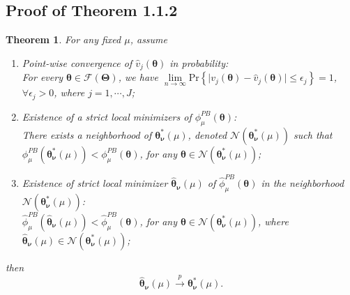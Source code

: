 \documentclass{article}
\newcommand{\wh}{\widehat}
\newcommand{\bs}{ \boldsymbol}
\newcommand{\ml}{\mathcal}
\newcommand{\lt}{\left}
\newcommand{\rt}{\right}
\newtheorem{theorem}{Theorem}[section]
\begin{document}
\begin{appendices}
\section{Proof of Theorem 1.1.2}
\begin{theorem}
	For any fixed $\mu$, assume 
	\begin{enumerate}
		\item Point-wise convergence of $\wh{v}_j(\bs{\theta})$ in probability:\\ For every $ \bs{\theta} \in \ml{F}(\bs{\Theta})$, we have $ \underset{n \to \infty}{\lim} \text{Pr} \lt\{ \mid v_j(\bs{\theta}) - \wh{v}_j(\bs{\theta}) \mid \le \epsilon_j \rt\}  = 1$, $\forall \epsilon_j > 0$, where $j = 1, \cdots, J$;
		\item Existence of a strict local minimizers of $\phi^{PB}_{\mu}\lt(\bs{\theta}\rt)$:\\
		There exists a neighborhood of $\bs{\theta}^{*}_{\bs{\nu}}(\mu)$, denoted $\ml{N}\lt(\bs{\theta}^{*}_{\bs{\nu}}(\mu)\rt)$ such that $\phi^{PB}_{\mu}\lt(\bs{\theta}^{*}_{\bs{\nu}}(\mu)\rt) < \phi^{PB}_{\mu}\lt(\bs{\theta}\rt)$, for any $\bs{\theta} \in \ml{N}\lt(\bs{\theta}^{*}_{\bs{\nu}}(\mu)\rt)$;
		\item Existence of strict local minimizer $\wh{\bs{\theta}}_{\bs{\nu}}(\mu)$ of $\wh{\phi}^{PB}_{\mu}\lt(\bs{\theta}\rt)$ in the neighborhood $\ml{N}\lt(\bs{\theta}^{*}_{\bs{\nu}}(\mu)\rt)$:\\  
		$ \wh{\phi}^{PB}_{\mu}\lt(\wh{\bs{\theta}}_{\bs{\nu}}(\mu)\rt) < \wh{\phi}^{PB}_{\mu}\lt(\bs{\theta}\rt)$, for any $\bs{\theta} \in \ml{N}\lt(\bs{\theta}^{*}_{\bs{\nu}}(\mu)\rt)$, where $\wh{\bs{\theta}}_{\bs{\nu}}(\mu) \in \ml{N}\lt(\bs{\theta}^{*}_{\bs{\nu}}(\mu)\rt)$;
	\end{enumerate} then 
	$$\wh{\bs{\theta}}_{\bs{\nu}}(\mu) \overset{p}{\to} \bs{\theta}^{*}_{\bs{\nu}}(\mu).$$
	
\end{theorem}


\end{appendices}
\end{document}
